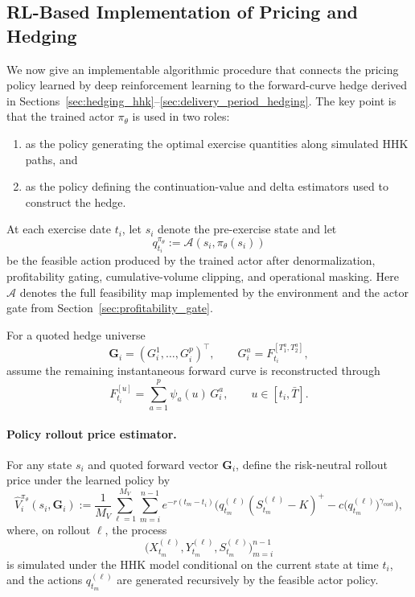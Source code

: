 \documentclass[10pt,a4paper,reqno]{amsart}
\newcommand{\<}{\langle}
\renewcommand{\>}{\rangle}
\theoremstyle{example}
\begin{document}
\subsection{RL-Based Implementation of Pricing and Hedging}
\label{sec:rl_pricing_hedging_impl}

We now give an implementable algorithmic procedure that connects the pricing policy learned by deep
reinforcement learning to the forward-curve hedge derived in
Sections~\ref{sec:hedging_hhk}--\ref{sec:delivery_period_hedging}. The key point is that the trained
actor $\pi_\theta$ is used in two roles:

\begin{enumerate}
    \item as the policy generating the optimal exercise quantities along simulated HHK paths, and
    \item as the policy defining the continuation-value and delta estimators used to construct the hedge.
\end{enumerate}

At each exercise date $t_i$, let $s_i$ denote the pre-exercise state and let
\[
q_{t_i}^{\pi_\theta} := \mathcal{A}(s_i,\pi_\theta(s_i))
\]
be the feasible action produced by the trained actor after denormalization, profitability gating,
cumulative-volume clipping, and operational masking. Here $\mathcal{A}$ denotes the full feasibility map
implemented by the environment and the actor gate from Section~\ref{sec:profitability_gate}.

For a quoted hedge universe
\[
\mathbf{G}_i = (G_i^1,\dots,G_i^p)^\top,
\qquad
G_i^a = F_{t_i}^{[T_1^a,T_2^a]},
\]
assume the remaining instantaneous forward curve is reconstructed through
\begin{equation}
\label{eq:rl_impl_curve_reconstruction}
F_{t_i}^{[u]}
=
\sum_{a=1}^p \psi_a(u)\,G_i^a,
\qquad
u\in[t_i,\bar T].
\end{equation}

\paragraph{Policy rollout price estimator.}
For any state $s_i$ and quoted forward vector $\mathbf{G}_i$, define the risk-neutral rollout price under
the learned policy by
\begin{equation}
\label{eq:policy_value_estimator}
\widehat{V}_i^{\pi_\theta}(s_i,\mathbf{G}_i)
:=
\frac{1}{M_V}
\sum_{\ell=1}^{M_V}
\sum_{m=i}^{n-1}
e^{-r(t_m-t_i)}
\Big(
q_{t_m}^{(\ell)}(S_{t_m}^{(\ell)}-K)^+
-
c \big(q_{t_m}^{(\ell)}\big)^{\gamma_{\mathrm{cost}}}
\Big),
\end{equation}
where, on rollout $\ell$, the process
\[
\big(X_{t_m}^{(\ell)},Y_{t_m}^{(\ell)},S_{t_m}^{(\ell)}\big)_{m=i}^{n-1}
\]
is simulated under the HHK model conditional on the current state at time $t_i$, and the actions
$q_{t_m}^{(\ell)}$ are generated recursively by the feasible actor policy.
\end{document}

